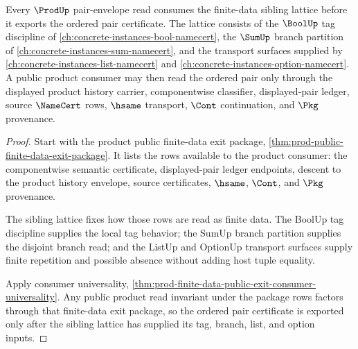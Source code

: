 \begin{theorem}
\label{thm:prod-finite-data-sibling-lattice}
Every $\ProdUp$ pair-envelope read consumes the finite-data sibling lattice before it exports the ordered pair certificate. The lattice consists of the $\BoolUp$ tag discipline of \autoref{ch:concrete-instances-bool-namecert}, the $\SumUp$ branch partition of \autoref{ch:concrete-instances-sum-namecert}, and the transport surfaces supplied by \autoref{ch:concrete-instances-list-namecert} and \autoref{ch:concrete-instances-option-namecert}. A public product consumer may then read the ordered pair only through the displayed product history carrier, componentwise classifier, displayed-pair ledger, source $\NameCert$ rows, $\hsame$ transport, $\Cont$ continuation, and $\Pkg$ provenance.
\end{theorem}
\begin{proof}
Start with the product public finite-data exit package, \autoref{thm:prod-public-finite-data-exit-package}. It lists the rows available to the product consumer: the componentwise semantic certificate, displayed-pair ledger endpoints, descent to the product history envelope, source certificates, $\hsame$, $\Cont$, and $\Pkg$ provenance.

The sibling lattice fixes how those rows are read as finite data. The BoolUp tag discipline supplies the local tag behavior; the SumUp branch partition supplies the disjoint branch read; and the ListUp and OptionUp transport surfaces supply finite repetition and possible absence without adding host tuple equality.

Apply consumer universality, \autoref{thm:prod-finite-data-public-exit-consumer-universality}. Any public product read invariant under the package rows factors through that finite-data exit package, so the ordered pair certificate is exported only after the sibling lattice has supplied its tag, branch, list, and option inputs.
\end{proof}
